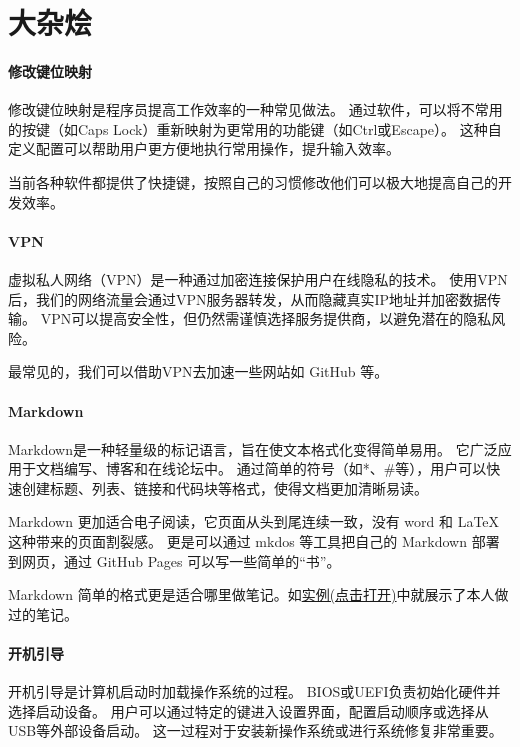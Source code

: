 \documentclass[16pt]{lzc}
\begin{document}
    \section{大杂烩}\label{sec:3}

        \paragraph{修改键位映射}
            修改键位映射是程序员提高工作效率的一种常见做法。
            通过软件，可以将不常用的按键（如Caps Lock）重新映射为更常用的功能键（如Ctrl或Escape）。
            这种自定义配置可以帮助用户更方便地执行常用操作，提升输入效率。

            当前各种软件都提供了快捷键，按照自己的习惯修改他们可以极大地提高自己的开发效率。

        \paragraph{VPN}
            虚拟私人网络（VPN）是一种通过加密连接保护用户在线隐私的技术。
            使用VPN后，我们的网络流量会通过VPN服务器转发，从而隐藏真实IP地址并加密数据传输。
            VPN可以提高安全性，但仍然需谨慎选择服务提供商，以避免潜在的隐私风险。

            最常见的，我们可以借助VPN去加速一些网站如 GitHub 等。

        \paragraph{Markdown}
            Markdown是一种轻量级的标记语言，旨在使文本格式化变得简单易用。
            它广泛应用于文档编写、博客和在线论坛中。
            通过简单的符号（如*、\#等），用户可以快速创建标题、列表、链接和代码块等格式，使得文档更加清晰易读。

            Markdown 更加适合电子阅读，它页面从头到尾连续一致，没有 word 和 \LaTeX 这种带来的页面割裂感。
            更是可以通过 mkdos 等工具把自己的 Markdown 部署到网页，通过 GitHub Pages 可以写一些简单的``书''。

            Markdown 简单的格式更是适合哪里做笔记。如\href{run:./实例.md}{实例(点击打开)}中就展示了本人做过的笔记。

        \paragraph{开机引导}
            开机引导是计算机启动时加载操作系统的过程。
            BIOS或UEFI负责初始化硬件并选择启动设备。
            用户可以通过特定的键进入设置界面，配置启动顺序或选择从USB等外部设备启动。
            这一过程对于安装新操作系统或进行系统修复非常重要。
\end{document}
